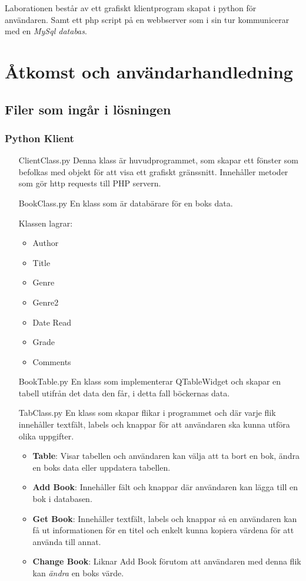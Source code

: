 \documentclass[11pt, titlepage, oneside, a4paper]{article}
\newcommand{\Section}[1]{\section{#1}\vspace{-8pt}}
\newcommand{\Subsection}[1]{\vspace{-4pt}\subsection{#1}\vspace{-8pt}}
\newcommand{\Subsubsection}[1]{\vspace{-4pt}\subsubsection{#1}\vspace{-8pt}}
\begin{document}
		Laborationen består av ett grafiskt klientprogram skapat i python för användaren.
		Samt ett php script på en webbserver som i sin tur kommunicerar med en \emph{MySql databas}.

		
        \Section{Åtkomst och användarhandledning} 
        	\Subsection{Filer som ingår i lösningen}
            \Subsubsection{Python Klient}
            \begin{itemize}
            \item[ClientClass.py] Denna klass är huvudprogrammet, som skapar ett fönster som befolkas med objekt för att visa ett grafiskt gränssnitt. Innehåller metoder som gör http requests till PHP servern.
            
            \item[BookClass.py] En klass som är databärare för en boks data. 
            
            Klassen lagrar:
            \begin{itemize}
            \item Author
            \item Title
            \item Genre
            \item Genre2
            \item Date Read
            \item Grade
            \item Comments
			\end{itemize}
            \item[BookTable.py] En klass som implementerar QTableWidget och skapar en tabell utifrån det data den får, i detta fall böckernas data.
           \newpage
           \item[TabClass.py] En klass som skapar flikar i programmet och där varje flik innehåller textfält, labels och knappar för att användaren ska kunna utföra olika uppgifter.
            
            \begin{itemize}
            \item \textbf{Table}: Visar tabellen och användaren kan välja att ta bort en bok, ändra en boks data eller uppdatera tabellen.
            \item \textbf{Add Book}: Innehåller fält och knappar där användaren kan lägga till en bok i databasen.
            \item \textbf{Get Book}: Innehåller textfält, labels och knappar så en användaren kan få ut informationen för en titel och enkelt kunna kopiera värdena för att använda till annat.
            \item \textbf{Change Book}: Liknar Add Book förutom att användaren med denna flik kan \emph{ändra} en boks värde.
			\end{itemize}
           
           \end{itemize}
                      
\end{document}
